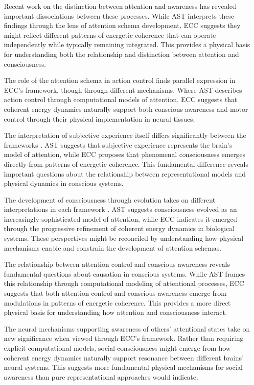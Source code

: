 Recent work on the distinction between attention and awareness \cite{Webb2016} has revealed important dissociations between these processes. While AST interprets these findings through the lens of attention schema development, ECC suggests they might reflect different patterns of energetic coherence that can operate independently while typically remaining integrated. This provides a physical basis for understanding both the relationship and distinction between attention and consciousness.

The role of the attention schema in action control \cite{WebbKemper2020} finds parallel expression in ECC's framework, though through different mechanisms. Where AST describes action control through computational models of attention, ECC suggests that coherent energy dynamics naturally support both conscious awareness and motor control through their physical implementation in neural tissues.

The interpretation of subjective experience itself differs significantly between the frameworks \cite{Graziano2019}. AST suggests that subjective experience represents the brain's model of attention, while ECC proposes that phenomenal consciousness emerges directly from patterns of energetic coherence. This fundamental difference reveals important questions about the relationship between representational models and physical dynamics in conscious systems.

The development of consciousness through evolution takes on different interpretations in each framework \cite{Graziano2013}. AST suggests consciousness evolved as an increasingly sophisticated model of attention, while ECC indicates it emerged through the progressive refinement of coherent energy dynamics in biological systems. These perspectives might be reconciled by understanding how physical mechanisms enable and constrain the development of attention schemas.

The relationship between attention control and conscious awareness \cite{WebbKemper2020} reveals fundamental questions about causation in conscious systems. While AST frames this relationship through computational modeling of attentional processes, ECC suggests that both attention control and conscious awareness emerge from modulations in patterns of energetic coherence. This provides a more direct physical basis for understanding how attention and consciousness interact.

The neural mechanisms supporting awareness of others' attentional states \cite{Kelly2014} take on new significance when viewed through ECC's framework. Rather than requiring explicit computational models, social consciousness might emerge from how coherent energy dynamics naturally support resonance between different brains' neural systems. This suggests more fundamental physical mechanisms for social awareness than pure representational approaches would indicate.

